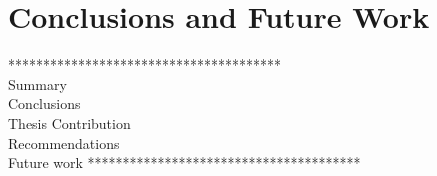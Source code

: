 \chapter{Conclusions and Future Work}

***************************************\\
Summary\\
Conclusions\\
Thesis Contribution\\
Recommendations\\
Future work
***************************************\\